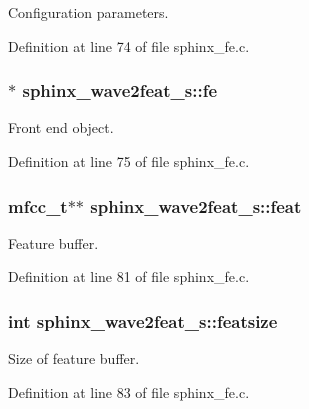 Configuration parameters. 



Definition at line 74 of file sphinx\+\_\+fe.\+c.

\subsubsection[{fe}]{$\ast$ sphinx\+\_\+wave2feat\+\_\+s\+::fe}\label{structsphinx__wave2feat__s_a5882f148fe200890855304b46f00ee4b}


Front end object. 



Definition at line 75 of file sphinx\+\_\+fe.\+c.

\subsubsection[{feat}]{\setlength{\rightskip}{0pt plus 5cm}mfcc\+\_\+t$\ast$$\ast$ sphinx\+\_\+wave2feat\+\_\+s\+::feat}\label{structsphinx__wave2feat__s_ab43d8d5721133bcaf02da23c0bbb58ae}


Feature buffer. 



Definition at line 81 of file sphinx\+\_\+fe.\+c.

\subsubsection[{featsize}]{\setlength{\rightskip}{0pt plus 5cm}int sphinx\+\_\+wave2feat\+\_\+s\+::featsize}\label{structsphinx__wave2feat__s_ac041852de738a42752be67cceb16660c}


Size of feature buffer. 



Definition at line 83 of file sphinx\+\_\+fe.\+c.

